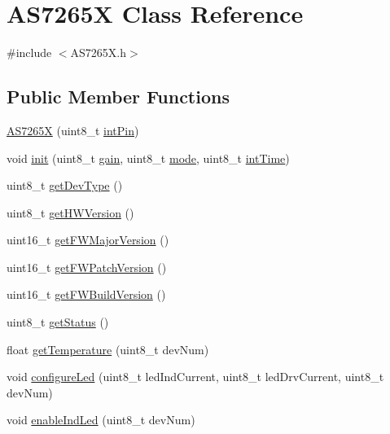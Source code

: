 \hypertarget{classAS7265X}{\section{A\-S7265\-X Class Reference}
\label{classAS7265X}
}


{\ttfamily \#include $<$A\-S7265\-X.\-h$>$}

\subsection*{Public Member Functions}
\begin{DoxyCompactItemize}
\item 
\hyperlink{classAS7265X_ab0a219e882880c6326831b023208d0e8}{A\-S7265\-X} (uint8\-\_\-t \hyperlink{Due__AS7265X__Spectrometer_8ino_a7a47c5b8a7e1c151db910d1c2518b08d}{int\-Pin})
\item 
void \hyperlink{classAS7265X_a9907d240a9ea427c9dbf364abeb5befd}{init} (uint8\-\_\-t \hyperlink{Due__AS7265X__Spectrometer_8ino_a5c9c0f59d06b7360c990c3f49be81fa7}{gain}, uint8\-\_\-t \hyperlink{USBtxEx_8ino_a1ea5d0cb93f22f7d0fdf804bd68c3326}{mode}, uint8\-\_\-t \hyperlink{Due__AS7265X__Spectrometer_8ino_a91f2d101a2ec3dda9ff42c39d3913a90}{int\-Time})
\item 
uint8\-\_\-t \hyperlink{classAS7265X_ac48976683ecfc39980e38a014c6bf4ca}{get\-Dev\-Type} ()
\item 
uint8\-\_\-t \hyperlink{classAS7265X_a459a056738954c4278ca34a0fe747218}{get\-H\-W\-Version} ()
\item 
uint16\-\_\-t \hyperlink{classAS7265X_a6e3d4246c80e3f83e9ddf429ce7aa91f}{get\-F\-W\-Major\-Version} ()
\item 
uint16\-\_\-t \hyperlink{classAS7265X_adcad0917c5364a69bdddef454d157b3c}{get\-F\-W\-Patch\-Version} ()
\item 
uint16\-\_\-t \hyperlink{classAS7265X_a82d5e97966bca0848ae86f825eb73d5e}{get\-F\-W\-Build\-Version} ()
\item 
uint8\-\_\-t \hyperlink{classAS7265X_ac6229e1348a54737db5b2304e08a93b5}{get\-Status} ()
\item 
float \hyperlink{classAS7265X_a0d8ed84b70b20d89c3b9015f7921a818}{get\-Temperature} (uint8\-\_\-t dev\-Num)
\item 
void \hyperlink{classAS7265X_a611f26fde46c536c2c81aff402ec8f6f}{configure\-Led} (uint8\-\_\-t led\-Ind\-Current, uint8\-\_\-t led\-Drv\-Current, uint8\-\_\-t dev\-Num)
\item 
void \hyperlink{classAS7265X_a6289ab2d63d091a5e5dd981b9dc4870c}{enable\-Ind\-Led} (uint8\-\_\-t dev\-Num)

\end{DoxyCompactItemize}
